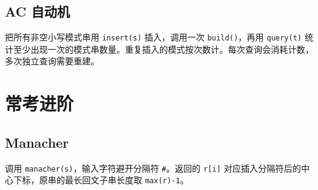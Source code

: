 
\subsection{AC 自动机}

把所有非空小写模式串用 \texttt{insert(s)} 插入，调用一次 \texttt{build()}，再用 \texttt{query(t)} 统计至少出现一次的模式串数量。重复插入的模式按次数计。每次查询会消耗计数，多次独立查询需要重建。


\section{常考进阶}

\subsection{Manacher}

调用 \texttt{manacher(s)}，输入字符避开分隔符 \texttt{\#}。返回的 \texttt{r[i]} 对应插入分隔符后的中心下标，原串的最长回文子串长度取 \texttt{max(r)-1}。

